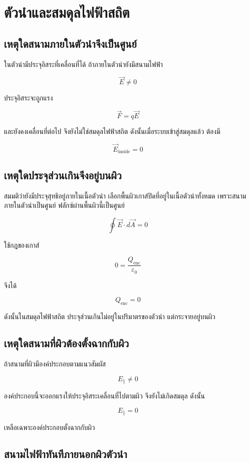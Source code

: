 \section{ตัวนำและสมดุลไฟฟ้าสถิต}

\subsection{เหตุใดสนามภายในตัวนำจึงเป็นศูนย์}

ในตัวนำมีประจุอิสระที่เคลื่อนที่ได้ ถ้าภายในตัวนำยังมีสนามไฟฟ้า

\[
\vec{E}\neq0
\]

ประจุอิสระจะถูกแรง

\[
\vec{F}=q\vec{E}
\]

และยังคงเคลื่อนที่ต่อไป จึงยังไม่ใช่สมดุลไฟฟ้าสถิต ดังนั้นเมื่อระบบเข้าสู่สมดุลแล้ว ต้องมี

\[
\boxed{\vec{E}_{\text{inside}}=0}
\]

\subsection{เหตุใดประจุส่วนเกินจึงอยู่บนผิว}

สมมติว่ายังมีประจุสุทธิอยู่ภายในเนื้อตัวนำ เลือกพื้นผิวเกาส์ปิดที่อยู่ในเนื้อตัวนำทั้งหมด เพราะสนามภายในตัวนำเป็นศูนย์ ฟลักซ์ผ่านพื้นผิวนี้เป็นศูนย์

\[
\oint \vec{E}\cdot d\vec{A}=0
\]

ใช้กฎของเกาส์

\[
0=\frac{Q_{\text{enc}}}{\varepsilon_0}
\]

จึงได้

\[
Q_{\text{enc}}=0
\]

ดังนั้นในสมดุลไฟฟ้าสถิต ประจุส่วนเกินไม่อยู่ในปริมาตรของตัวนำ แต่กระจายอยู่บนผิว

\subsection{เหตุใดสนามที่ผิวต้องตั้งฉากกับผิว}

ถ้าสนามที่ผิวมีองค์ประกอบตามแนวสัมผัส

\[
E_{\parallel}\neq0
\]

องค์ประกอบนี้จะออกแรงให้ประจุอิสระเคลื่อนที่ไปตามผิว จึงยังไม่เกิดสมดุล ดังนั้น

\[
E_{\parallel}=0
\]

เหลือเฉพาะองค์ประกอบตั้งฉากกับผิว

\subsection{สนามไฟฟ้าทันทีภายนอกผิวตัวนำ}

